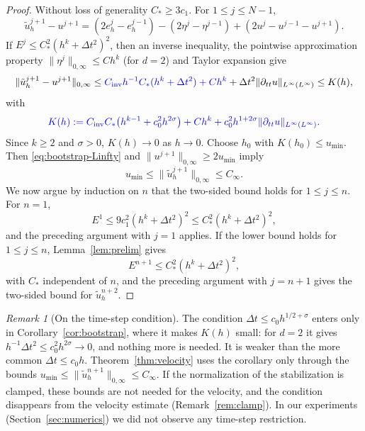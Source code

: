 \documentclass[11pt]{article}
\theoremstyle{remark}\newtheorem{remark}{Remark}
\newcommand{\tu}{\tilde u_h}
\theoremstyle{plain}
\newcommand{\new}[1]{{\color{blue}#1}}
\begin{document}
\begin{proof}
Without loss of generality $C_*\ge3c_1$. For $1\le j\le N-1$,
\[
\tu^{j+1}-u^{j+1}=(2e_h^j-e_h^{j-1})-(2\eta^j-\eta^{j-1})+(2u^j-u^{j-1}-u^{j+1}).
\]
If $E^j\le C_*^2(h^k+\Delta t^2)^2$, then an inverse inequality, the pointwise approximation property \new{$\|\eta^j\|_{0,\infty}\le Ch^{k}$ (for $d=2$)} and Taylor expansion give
\begin{equation}\label{eq:bootstrap-Linfty}
\|\tu^{j+1}-u^{j+1}\|_{0,\infty}\le \new{C_{\mathrm{inv}}h^{-1}C_*(h^k+\Delta t^2)+Ch^{k}}+\Delta t^2\|\partial_{tt}u\|_{L^\infty(L^\infty)}
\le K(h),
\end{equation}
with
\[
\new{K(h):=C_{\mathrm{inv}}C_*\big(h^{k-1}+c_0^2h^{2\sigma}\big)+Ch^{k}+c_0^2h^{1+2\sigma}\|\partial_{tt}u\|_{L^\infty(L^\infty)}.}
\]
\new{Since $k\ge2$ and $\sigma>0$, $K(h)\to0$ as $h\to0$.} Choose $h_0$ with $K(h_0)\le u_{\min}$. Then \eqref{eq:bootstrap-Linfty} and $\|u^{j+1}\|_{0,\infty}\ge2u_{\min}$ imply
\[
u_{\min}\le\|\tu^{j+1}\|_{0,\infty}\le C_\infty .
\]
We now argue by induction on $n$ that the two-sided bound holds for $1\le j\le n$. For $n=1$,
$$
E^1\le9c_1^2(h^k+\Delta t^2)^2\le C_*^2(h^k+\Delta t^2)^2,
$$
and the preceding argument with $j=1$ applies. If the lower bound holds for $1\le j\le n$, Lemma~\ref{lem:prelim} gives
$$
E^{n+1}\le C_*^2(h^k+\Delta t^2)^2,
$$
with $C_*$ independent of $n$, and the preceding argument with $j=n+1$ gives the two-sided bound for $\tu^{n+2}$.
\end{proof}

\new{\begin{remark}[On the time-step condition]\label{rem:timestep}
The condition $\Delta t\le c_0h^{1/2+\sigma}$ enters only in Corollary~\ref{cor:bootstrap}, where it makes $K(h)$ small: for $d=2$ it gives $h^{-1}\Delta t^2\le c_0^2h^{2\sigma}\to0$, and nothing more is needed. It is weaker than the more common $\Delta t\le c_0h$. Theorem~\ref{thm:velocity} uses the corollary only through the bounds $u_{\min}\le\|\tu^{n+1}\|_{0,\infty}\le C_\infty$. If the normalization of the stabilization is clamped, these bounds are not needed for the velocity, and the condition disappears from the velocity estimate (Remark~\ref{rem:clamp}). In our experiments (Section~\ref{sec:numerics}) we did not observe any time-step restriction.
\end{remark}}
\end{document}
